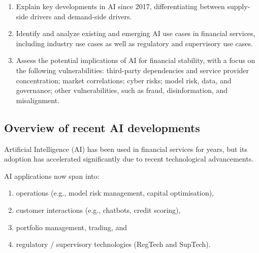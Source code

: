 
\begin{cikeybox}[title={The three objectives, in the spine's own words}]
\begin{enumerate}[label=\textbf{\alph*.}]
\item Explain key developments in AI since 2017, differentiating between supply-side drivers
and demand-side drivers.
\item Identify and analyze existing and emerging AI use cases in financial services,
including industry use cases as well as regulatory and supervisory use cases.
\item Assess the potential implications of AI for financial stability, with a focus on the
following vulnerabilities: third-party dependencies and service provider concentration;
market correlations; cyber risks; model risk, data, and governance; other vulnerabilities,
such as fraud, disinformation, and misalignment.
\end{enumerate}
\end{cikeybox}


\subsection*{Overview of recent AI developments}

Artificial Intelligence (AI) has been used in financial services for years, but its adoption
has accelerated significantly due to recent technological advancements.

AI applications now span into:

\begin{enumerate}[label=\textbf{\alph*)}]
\item operations (e.g., model risk management, capital optimisation),
\item customer interactions (e.g., chatbots, credit scoring),
\item portfolio management, trading, and
\item regulatory / supervisory technologies (RegTech and SupTech).
\end{enumerate}

